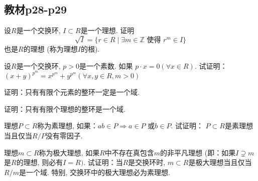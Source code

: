 \subsection{教材p28-p29}

\begin{problem}
    设$R$是一个交换环, $I \subset R$是一个理想. 证明
\[
    \sqrt{I} = \{r \in R \mid \exists m \in \mathbb{Z} \text{ 使得 } r^m \in I\}
\]
也是$R$的理想 (称为理想$I$的根).
\end{problem}

\begin{solution}
    
\end{solution}

\begin{problem}
    设$R$是一个交换环, $p > 0$是一个素数. 如果
$p \cdot x = 0 (\forall x\in R)$. 试证明：
$(x + y)^{p^m} = x^{p^m}+y^{p^m} (\forall x, y \in R, m > 0)$
\end{problem}

\begin{solution}
    
\end{solution}

\begin{problem}
    证明：只有有限个元素的整环一定是一个域.
\end{problem}

\begin{solution}
    
\end{solution}

\begin{problem}
    证明：只有有限个理想的整环是一个域.
\end{problem}

\begin{solution}
    
\end{solution}

\begin{problem}
    理想$P \subset R$称为素理想, 如果：$ab \in P \Rightarrow a \in P$
或$b \in P$. 试证明：
$P \subset R$是素理想当且仅当$R/P$没有零因子.
\end{problem}

\begin{solution}
    
\end{solution}

\begin{problem}
    理想$m \subset R$称为极大理想, 如果$R$中不存在真包含$m$的非平凡理想
(即：如果$I \supsetneq m$是$R$的理想, 则必有$I = R)$. 试证明：当$R$是交换环时, 
$m \subset R$是极大理想当且仅当$R/m$是一个域. 特别, 交换环中的极大理想必为素理想.
\end{problem}

